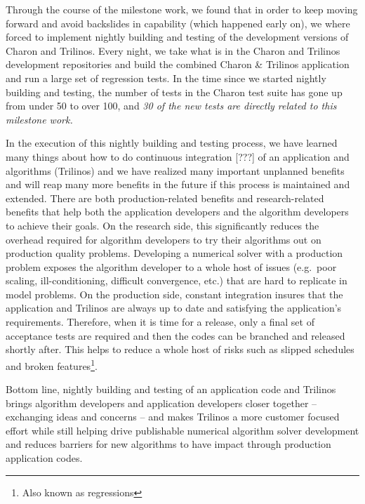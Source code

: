 \documentclass[pdf,ps2pdf,11pt]{SANDreport}
\begin{document}
Through the course of the milestone work, we found that in order to keep
moving forward and avoid backslides in capability (which happened early on),
we where forced to implement nightly building and testing of the development
versions of Charon and Trilinos.  Every night, we take what is in the Charon
and Trilinos development repositories and build the combined Charon \&
Trilinos application and run a large set of regression tests.  In the time
since we started nightly building and testing, the number of tests in the
Charon test suite has gone up from under 50 to over 100, and {\em 30 of the
new tests are directly related to this milestone work.}

In the execution of this nightly building and testing process, we have learned
many things about how to do continuous integration [???] of an application and
algorithms (Trilinos) and we have realized many important unplanned benefits
and will reap many more benefits in the future if this process is maintained
and extended.  There are both production-related benefits and research-related
benefits that help both the application developers and the algorithm
developers to achieve their goals.  On the research side, this significantly
reduces the overhead required for algorithm developers to try their algorithms
out on production quality problems.  Developing a numerical solver with a
production problem exposes the algorithm developer to a whole host of issues
(e.g.\ poor scaling, ill-conditioning, difficult convergence, etc.) that are
hard to replicate in model problems.  On the production side, constant
integration insures that the application and Trilinos are always up to date
and satisfying the application's requirements.  Therefore, when it is time for
a release, only a final set of acceptance tests are required and then the
codes can be branched and released shortly after.  This helps to reduce a
whole host of risks such as slipped schedules and broken
features\footnote{Also known as regressions}.


Bottom line, nightly building and testing of an application code and Trilinos
brings algorithm developers and application developers closer together --
exchanging ideas and concerns -- and makes Trilinos a more customer focused
effort while still helping drive publishable numerical algorithm solver
development and reduces barriers for new algorithms to have impact through
production application codes.
\end{document}
